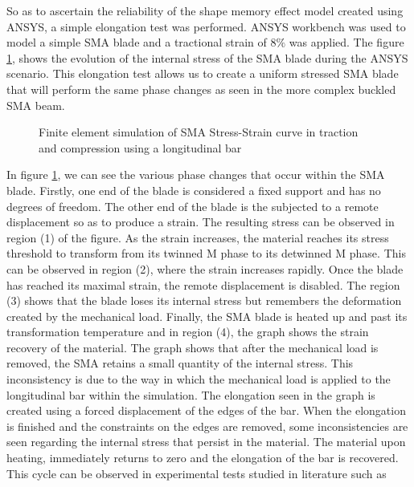 So as to ascertain the reliability of the shape memory effect model created using ANSYS, a simple elongation test was performed. ANSYS workbench was used to model a simple SMA blade and a tractional strain of 8$\%$ was applied. The figure \ref{fig:FigElongationStressStrain}, shows the evolution of the internal stress of the SMA blade during the ANSYS scenario. This elongation test allows us to create a uniform stressed SMA blade that will perform the same phase changes as seen in the more complex buckled SMA beam.

\begin{figure}
	\vspace{-20pt}
	\centering
  {\footnotesize
	\def\svgwidth{0.5\textwidth}
	
  }
	\caption{Finite element simulation of SMA Stress-Strain curve in traction and compression using a longitudinal bar}
	\vspace{-15pt}
	\label{fig:FigElongationStressStrain}
\end{figure}

In figure \ref{fig:FigElongationStressStrain}, we can see the various phase changes that occur within the SMA blade. Firstly, one end of the blade is considered a fixed support and has no degrees of freedom. The other end of the blade is the subjected to a remote displacement so as to produce a strain. The resulting stress can be observed in region (1) of the figure. As the strain increases, the material reaches its stress threshold to transform from its twinned M phase to its detwinned M phase. This can be observed in region (2), where the strain increases rapidly. Once the blade has reached its maximal strain, the remote displacement is disabled. The region (3) shows that the blade loses its internal stress but remembers the deformation created by the mechanical load. Finally, the SMA blade is heated up and past its transformation temperature and in region (4), the graph shows the strain recovery of the material. The graph shows that after the mechanical load is removed, the SMA retains a small quantity of the internal stress. This inconsistency is due to the way in which the mechanical load is applied to the longitudinal bar within the simulation. The elongation seen in the graph is created using a forced displacement of the edges of the bar. When the elongation is finished and the constraints on the edges are removed, some inconsistencies are seen regarding the internal stress that persist in the material. The material upon heating, immediately returns to zero and the elongation of the bar is recovered. This cycle can be observed in experimental tests studied in literature such as \cite{hongchun_xie_design_2007, liu_asymmetry_1998}

